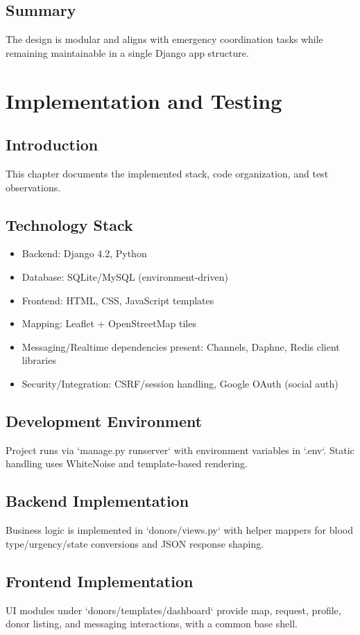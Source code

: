 \documentclass[12pt,a4paper]{report}
\begin{document}
\section{Summary}
The design is modular and aligns with emergency coordination tasks while remaining maintainable in a single Django app structure.

\chapter{Implementation and Testing}
\section{Introduction}
This chapter documents the implemented stack, code organization, and test observations.

\section{Technology Stack}
\begin{itemize}[leftmargin=1.5em]
\item Backend: Django 4.2, Python
\item Database: SQLite/MySQL (environment-driven)
\item Frontend: HTML, CSS, JavaScript templates
\item Mapping: Leaflet + OpenStreetMap tiles
\item Messaging/Realtime dependencies present: Channels, Daphne, Redis client libraries
\item Security/Integration: CSRF/session handling, Google OAuth (social auth)
\end{itemize}

\section{Development Environment}
Project runs via `manage.py runserver` with environment variables in `.env`. Static handling uses WhiteNoise and template-based rendering.

\section{Backend Implementation}
Business logic is implemented in `donors/views.py` with helper mappers for blood type/urgency/state conversions and JSON response shaping.

\section{Frontend Implementation}
UI modules under `donors/templates/dashboard` provide map, request, profile, donor listing, and messaging interactions, with a common base shell.
\end{document}
